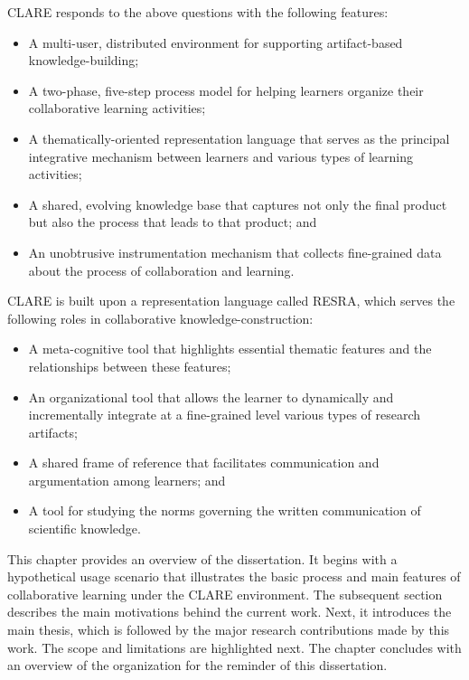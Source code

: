 CLARE responds to the above questions with the following features:

\begin{itemize}
\item A multi-user, distributed environment for supporting artifact-based
  knowledge-building;
  
\item A two-phase, five-step process model for helping learners organize
  their collaborative learning activities;
  
\item A thematically-oriented representation language that serves as the
  principal integrative mechanism between learners and various types of
  learning activities;
  
\item A shared, evolving knowledge base that captures not only the final
  product but also the process that leads to that product; and 
  
\item An unobtrusive instrumentation mechanism that collects fine-grained
  data about the process of collaboration and learning.
\end{itemize}

CLARE is built upon a representation language called RESRA, which serves
the following roles in collaborative knowledge-construction:

\begin{itemize}
\item A meta-cognitive tool that highlights essential thematic features and
  the relationships between these features;
  
\item An organizational tool that allows the learner to dynamically and
  incrementally integrate at a fine-grained level various types of
  research artifacts;
  
\item A shared frame of reference that facilitates communication and
  argumentation among learners; and
  
\item A tool for studying the norms governing the written communication of
  scientific knowledge.
\end{itemize}

This chapter provides an overview of the dissertation. It begins with a
hypothetical usage scenario that illustrates the basic process and main
features of collaborative learning under the CLARE environment. The
subsequent section describes the main motivations behind the current
work. Next, it introduces the main thesis, which is followed by the major
research contributions made by this work. The scope and limitations are
highlighted next. The chapter concludes with an overview of the
organization for the reminder of this dissertation.


